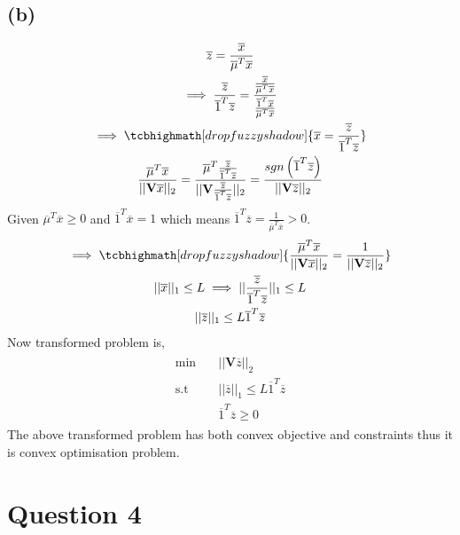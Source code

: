 \documentclass{article}
\begin{document}
\subsection*{(b)}
\begin{gather*}
	\overline{z} = \frac{\overline{x}}{\overline{\mu}^T\overline{x}}\\\implies
	\frac{\overline{z}}{\overline{1}^T\overline{z}} = \frac{\frac{\overline{x}}{\overline{\mu}^T\overline{x}}}{\frac{\overline{1}^T\overline{x}}{\overline{\mu}^T\overline{x}}}\\
	\implies \tcbhighmath[drop fuzzy shadow]{\overline{x} = \frac{\overline{z}}{\overline{1}^T\overline{z}}}\\
	\frac{\overline{\mu}^T\overline{x}}{||\mathbf{V}\overline{x}||_2} = \frac{\overline{\mu}^T\frac{\overline{z}}{\overline{1}^T\overline{z}}}{||\mathbf{V}\frac{\overline{z}}{\overline{1}^T\overline{z}}||_2} = \frac{sgn\left(\overline{1}^T\overline{z}\right)}{||\mathbf{V}\overline{z}||_2}
\end{gather*}
Given $\overline{\mu}^T\overline{x} \ge 0$ and $\overline{1}^T\overline{x} = 1$ which means $\overline{1}^T\overline{z} = \frac{1}{\overline{\mu}^T\overline{x}} > 0$.
\begin{gather*}
	\implies \tcbhighmath[drop fuzzy shadow]{\frac{\overline{\mu}^T\overline{x}}{||\mathbf{V}\overline{x}||_2} = \frac{1}{||\mathbf{V}\overline{z}||_2}}\\
	||\overline{x}||_1 \le L \implies ||\frac{\overline{z}}{\overline{1}^T\overline{z}}||_1 \le L\\
	{||\overline{z}||_1} \le L{\overline{1}^T\overline{z}}
\end{gather*}
Now transformed problem is,
\begin{gather*}
	\begin{aligned}
		\min \quad & ||\mathbf{V}\overline{z}||_2\\
		\textrm{s.t} \quad & {||\overline{z}||_1} \le L{\overline{1}^T\overline{z}}\\
		& \overline{1}^T\overline{z} \ge 0
	\end{aligned}
\end{gather*}
The above transformed problem has both convex objective and constraints thus it is convex optimisation problem.
\section*{\hfil Question 4}
\end{document}
